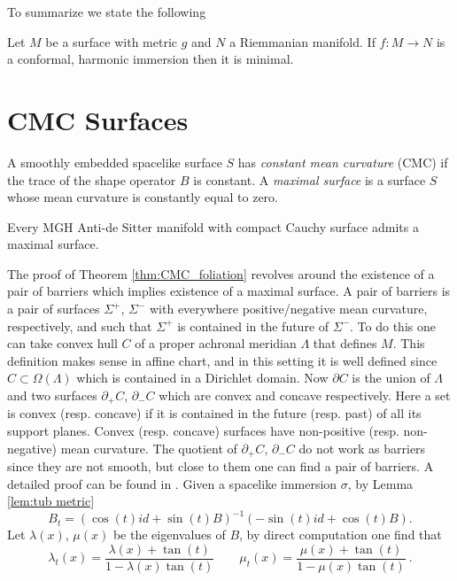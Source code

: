 To summarize we state the following
\begin{theorem}\label{thm:minimal}
    Let $M$ be a surface with metric $g$ and $N$ a Riemmanian manifold. If $f: M \to N$ is a conformal, harmonic immersion then it is minimal.
\end{theorem}

\section{CMC Surfaces}
A smoothly embedded spacelike surface $S$ has \textit{constant mean curvature} (CMC) if the trace of the shape operator $B$ is constant. A \textit{maximal surface} is a surface $S$ whose mean curvature is constantly equal to zero.
\begin{theorem}\label{thm:CMC_foliation}
    Every MGH Anti-de Sitter manifold with compact Cauchy surface admits a maximal surface.
\end{theorem}
The proof of Theorem \ref{thm:CMC_foliation} revolves around the existence of a pair of barriers which implies existence of a maximal surface. A pair of barriers is a pair of surfaces $\Sigma^+$, $\Sigma^-$ with everywhere positive/negative mean curvature, respectively, and such that $\Sigma^+$ is contained in the future of $\Sigma^-$.
To do this one can take convex hull $C$ of a proper achronal meridian $\Lambda$ that defines $M$. This definition makes sense in affine chart, and in this setting it is well defined since $C \subset \Omega(\Lambda)$ which is contained in a Dirichlet domain. Now $\partial C$ is the union of $\Lambda$ and two surfaces $\partial_+ C$, $\partial_- C$ which are convex and concave respectively. Here a set is convex (resp. concave) if it is contained in the future (resp. past) of all its support planes. Convex (resp. concave) surfaces have non-positive (resp. non-negative) mean curvature. The quotient of $\partial_+ C$, $\partial_- C$ do not work as barriers since they are not smooth, but close to them one can find a pair of barriers.
A detailed proof can be found in \cite{barbot2004constant}.
Given a spacelike immersion $\sigma$, by Lemma \ref{lem:tub metric}
\[
    B_t = (\cos(t) id + \sin(t) B)^{-1}(-\sin(t) id + \cos(t) B).
\]
Let $\lambda(x)$, $\mu(x)$ be the eigenvalues of $B$, by direct computation one find that
\begin{equation} \label{eq:eigenvalues}
    \lambda_t(x) = \frac{\lambda(x)+\tan(t)}{1- \lambda(x)\tan(t)} \qquad \mu_t(x) = \frac{\mu(x)+\tan(t)}{1- \mu(x)\tan(t)} \ .
\end{equation}
